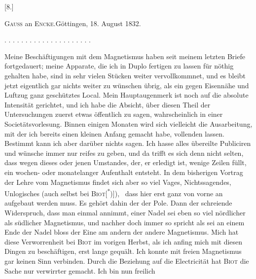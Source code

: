 \clearpage\begingroup{}\HistoricalFoot{}{11\textsuperscript{*}}
\begin{center}[8.]\end{center}
\begin{center}\textsc{Gauss} an \textsc{Encke}.\quad Göttingen, 18. August 1832.\end{center}
\noindent . . . . . . . . . . . . . . . . . . . . .\par
\indent Meine Beschäftigungen mit dem Magnetismus haben seit meinem letzten
Briefe fortgedauert; meine Apparate, die ich in Duplo fertigen zu lassen für
nöthig gehalten habe, sind in sehr vielen Stücken weiter vervollkommnet, und
es bleibt jetzt eigentlich gar nichts weiter zu wünschen übrig, als ein gegen
Eisennähe und Luftzug ganz geschütztes Local. Mein Hauptaugenmerk ist
noch auf die absolute Intensität gerichtet, und ich habe die Absicht, über
diesen Theil der Untersuchungen zuerst etwas öffentlich zu sagen, wahrscheinlich
in einer Societätsvorlesung. Binnen einigen Monaten wird sich vielleicht
die Ausarbeitung, mit der ich bereits einen kleinen Anfang gemacht habe,
vollenden lassen. Bestimmt kann ich aber darüber nichts sagen. Ich hasse
alles übereilte Publiciren und wünsche immer nur reifes zu geben, und da
trifft es sich denn nicht selten, dass wegen dieses oder jenen Umstandes, der,
 er erledigt ist, wenige Zeilen füllt, ein wochen- oder monatelanger
Aufenthalt entsteht. In dem bisherigen Vortrag der Lehre vom Magnetismus
findet sich aber so viel Vages, Nichtssagendes, Unlogisches (auch selbst bei
\textsc{Biot}[\textsuperscript{*})]),\begingroup\renewcommand{\thefootnote}{}
\endgroup\ dass hier erst ganz von vorne an aufgebaut werden muss. Es gehört
dahin der  der Pole. Dann der schreiende Widerspruch, dass man
einmal annimmt,  einer Nadel sei eben so viel nördlicher
als südlicher Magnetismus, und nachher doch immer so spricht als sei
an einem Ende der Nadel bloss der Eine am andern der andere Magnetismus.
Mich hat diese Verworrenheit bei \textsc{Biot} im vorigen Herbst, als ich anfing mich
mit diesen Dingen zu beschäftigen, erst lange gequält. Ich konnte mit 
freien Magnetismus gar keinen Sinn verbinden. Durch die Beziehung auf die
Electricität hat \textsc{Biot} die Sache nur verwirrter gemacht. Ich bin nun freilich
